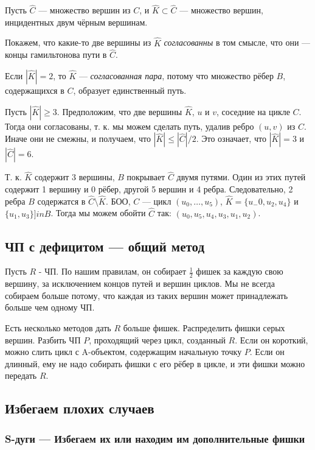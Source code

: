 \begin{proofstar}
Пусть $\hat{C}$ --- множество вершин из $C$, и $\hat{K} \subset \hat{C}$ --- множество вершин, инцидентных двум чёрным вершинам. 

Покажем, что какие-то две вершины из $\hat{K}$ \textit{согласованны} в том смысле, что они --- концы гамильтонова пути в $\hat{C}$.

Если $|\hat{K}| = 2$, то $\hat{K}$ --- \textit{согласованная пара}, потому что множество рёбер $B$, содержащихся в $C$, образует единственный путь.

Пусть $|\hat{K}| \ge 3$. 
Предположим, что две вершины $\hat{K}$, $u$ и $v$, соседние на цикле $C$. Тогда они согласованы, т. к. мы можем сделать путь, удалив ребро $(u, v)$ из $C$.
Иначе они не смежны, и получаем, что $|\hat{K}| \le |\hat{C}|/2$. Это означает, что $|\hat{K}| = 3$ и $|\hat{C}| = 6$.

Т. к. $\hat{K}$ содержит 3 вершины, $B$ покрывает $\hat{C}$ двумя путями. Один из этих путей содержит 1 вершину и 0 рёбер, другой 5 вершин и 4 ребра. Следовательно, 2 ребра $B$ содержатся в $\hat{C} \setminus \hat{K}$. БОО, $C$ --- цикл $(u_0, \dots, u_5)$, $\hat{K} = \{u_-0, u_2, u_4\}$ и $\{u_1, u_3\} ]in B$. Тогда мы можем обойти $\hat{C}$ так: $(u_0, u_5, u_4, u_3, u_1, u_2)$.

\subsection{ЧП с дефицитом --- общий метод}
Пусть $R$ - ЧП. По нашим правилам, он собирает $\frac{1}{2}$ фишек за каждую свою вершину, за исключением концов путей и вершин циклов. Мы не всегда собираем больше потому, что каждая из таких вершин может принадлежать больше чем одному ЧП.

Есть несколько методов дать $R$ больше фишек.
Распределить фишки серых вершин.
Разбить ЧП $P$, проходящий через цикл, созданный $R$. Если он короткий, можно слить цикл с A-объектом, содержащим начальную точку $P$. Если он длинный, ему не надо собирать фишки с его рёбер в цикле, и эти фишки можно передать $R$.

\subsection{Избегаем плохих случаев}
\subsubsection{S-дуги --- Избегаем их или находим им дополнительные фишки}


\end{proofstar}
